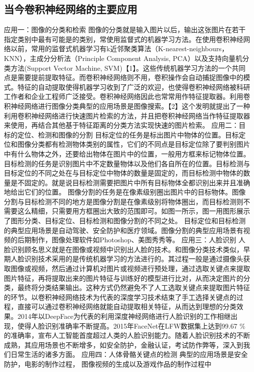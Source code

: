 \subsection{当今卷积神经网络的主要应用}
应用一：图像的分类和检索
图像的分类就是输入图片以后，输出这张图片在若干指定类别中最有可能是的类别，常使用监督式的机器学习方法。在使用卷积神经网络以前，常用的监督式机器学习有k近邻聚类算法（K-nearest-neighbours，KNN），主成分分析法（Principle Component Analysis, PCA）以及支持向量机分类方法(Support Vector Machine, SVM)【1】。这些传统机器学习方法的一个共同点是需要提前提取特征。而卷积神经网络则不用，卷积操作会自动捕捉图像中的模式。特征的自动提取使得机器学习收到了广泛的欢迎，也使得卷积神经网络被科研工作者和企业工程师广泛接受。卷积神经网络因此也常常用作特征提取器。利用卷积神经网络进行图像分类典型的应用场景是图像搜索。【2】这个发明就提出了一种利用卷积神经网络进行快速图片检索的方法，并且把卷积神经网络当作特征提取器来使用，再结合其他基于特征距离的分类方法实现快速的图片检索。
应用二：目标的定位、检测和图像的分割
目标定位的任务是标出图片中物体的位置。目标定位和图像分类都有检测物体类别的属性，它们的不同点是目标定位除了要判别图片中有什么物体之外，还要给出物体在图片中的位置，一般用方框来标记物体位置。
目标检测的任务是识别图片中不定数量物体以及他们各自所在的位置。目标检测与目标定位的不同之处在与目标定位中物体的数量是固定的，而目标检测中物体的数量是不固定的。就是说目标检测需要把图片中所有目标物体全都识别出来并且准确地给出它们的位置。
图像分割的任务是在像素级别圈出图片中的目标物体。图像分割与目标检测不同的地方是图像分割是在像素级别将物体圈出，而目标检测则不需要这么精细，只需要用方框圈出大致的范围即可。如图一所示，图一用图形展示了图形分类、目标定位、目标检测和图像分割的不同之处。
目标定位和目标检测的典型应用场景是自动驾驶、安全防护和医疗领域。图像分割的典型应用场景有视频的后期制作，图像处理软件如Photoshop、美图秀秀等。
应用三：人脸识别
人脸识别顾名思义就是在图像或视频中识别出人脸的技术。和图像分类技术类似，早期人脸识别技术采用的是传统机器学习的方法进行的。其过程一般是通过摄像头获取图像或视频，然后通过计算机对图片或视频进行预处理，通过选取关键点来提取图片特征，再将提取出来的图片特征与训练好的模型进行比对，从而决定图片的分类，最终将分类结果输出。这种方式仍然避免不了人工选取关键点来提取图片特征的环节。以卷积神经网络技术为代表的深度学习技术结束了手工选择关键点的过程，直接可以通过卷积神经网络就能自动提取相关特征，从而达到理想的分类效果。2014年以DeepFace为代表的利用深度神经网络进行人脸识别的工作相继出现，使得人脸识别准确率不断提高。2015年FaceNet在LFW数据集上达到99.67 $\%$的准确率，宣布人工智能首度超过人类的人脸识别能力。随着人脸识别技术的不断成熟，其应用场景也不断增多，如安全防护，金融认证，考试防作弊等，深入到我们日常生活的诸多方面。
应用四：人体骨骼关键点的检测
典型的应用场景是安全防护，电影的制作过程， 图像视频的生成以及游戏作品的制作过程中

